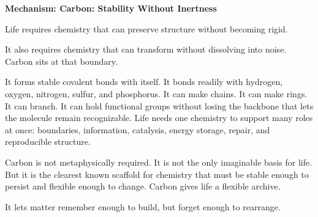 \documentclass[11pt,twoside,openright]{book}
\newenvironment{mechanismbox}[1]
  {\begin{framed}\noindent\textbf{Mechanism: #1}\par\medskip}
  {\end{framed}}
\begin{document}
\begin{mechanismbox}{Carbon: Stability Without Inertness}
Life requires chemistry that can preserve structure
without becoming rigid.

It also requires chemistry that can transform without dissolving into noise. Carbon sits at that boundary.

It forms stable covalent bonds with itself. It bonds readily with hydrogen, oxygen, nitrogen, sulfur, and phosphorus. It can make chains. It can make rings. It can branch. It can hold functional groups without losing the backbone that lets the molecule remain recognizable. Life needs one chemistry to support many roles at once: boundaries, information, catalysis, energy storage, repair, and reproducible structure.

Carbon is not metaphysically required. It is not the only imaginable basis for life. But it is the clearest known scaffold for chemistry that must be stable enough to persist and flexible enough to change. Carbon gives life a flexible archive.

It lets matter remember enough to build,
but forget enough to rearrange.
\end{mechanismbox}
\end{document}
